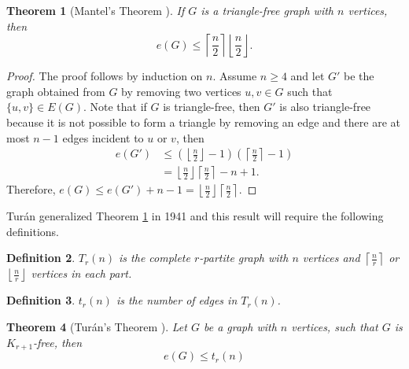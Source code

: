 \documentclass[12pt,twoside,a4paper,bibliography=totocnumbered]{book}
\numberwithin{equation}{section}
\newtheorem{theorem}             {Theorem}[section]
\newtheorem{definition}	[theorem] {Definition}
\theoremstyle{remark}
\begin{document}
\begin{theorem}[{Mantel's Theorem \cite{Ma07}}]\label{the:mantel}
If $G$ is a triangle-free graph with $n$ vertices, then 
$$e(G) \leq \left\lceil \frac{n}{2} \right\rceil \left\lfloor \frac{n}{2} \right\rfloor .$$
\end{theorem}
\begin{proof}
The proof follows by induction on $n$. Assume $n \geq 4$ and let $G'$ be the graph obtained from $G$ by removing two vertices $u,v \in G$ such that $\{u,v\}\in E(G)$. Note that if $G$ is triangle-free, then $G'$ is also triangle-free because it is not possible to form a triangle by removing an edge and there are at most $n-1$ edges incident to $u$ or $v$, then
\begin{align*}
e(G') &\leq \left(\left\lfloor \frac{n}{2} \right\rfloor -1\right)\left(\left\lceil \frac{n}{2} \right\rceil -1\right) \\
&= \left\lfloor \frac{n}{2} \right\rfloor \left\lceil \frac{n}{2} \right\rceil - n +1.
\end{align*}	
Therefore, $e(G) \leq e(G') + n-1 = \left\lfloor \frac{n}{2} \right\rfloor \left\lceil \frac{n}{2} \right\rceil$. 
\end{proof}

Turán generalized Theorem \ref{the:mantel} in 1941 and this result will require the following definitions. 
\begin{definition}$T_r(n)$ is the complete $r$-partite graph with $n$ vertices and $\left\lceil \frac{n}{r} \right\rceil$ or $\left\lfloor \frac{n}{r} \right\rfloor$ vertices in each part.
\end{definition}

\begin{definition}
$t_r(n)$ is the number of edges in $T_r(n)$.
\end{definition}

\begin{theorem}[{Turán's Theorem \cite{Tu41}}] \label{theorem:turan1941}%
Let $G$ be a graph with $n$ vertices, such that $G$ is $K_{r+1}$-free, then
$$ e(G) \leq t_r(n) $$
\end{theorem}
\end{document}
